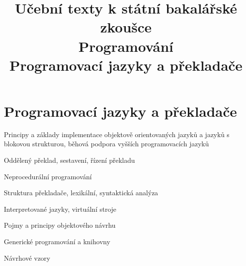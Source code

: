 \clearpage  \clearpage
\title{\LARGE Učební texty k státní bakalářské zkoušce \\ Programování \\ Programovací jazyky a překladače}

\maketitle
\newpage
\setcounter{section}{3}
\section{Programovací jazyky a překladače}
\begin{pozadavky}
\begin{pitemize}
\item Principy a základy implementace objektově orientovaných jazyků a jazyků s blokovou strukturou, běhová podpora vyšších programovacích jazyků
\item Oddělený překlad, sestavení, řízení překladu
\item Neprocedurální programování
\item Struktura překladače, lexikální, syntaktická analýza
\item Interpretované jazyky, virtuální stroje
\item Pojmy a principy objektového návrhu
\item Generické programování a knihovny
\item Návrhové vzory
\end{pitemize}
\end{pozadavky}










